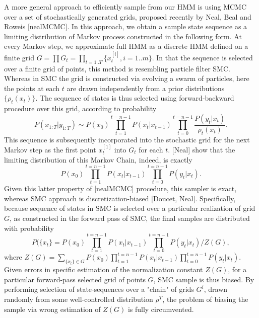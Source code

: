 \documentclass[amsmath,amssymb]{revtex4}
\begin{document}
A more general approach to efficiently sample from our HMM is using MCMC over a set of stochastically generated grids, proposed recently by Neal, Beal and Roweis [nealMCMC]. In this approach, we obtain a sample state sequence as a limiting distribution of Markov process constructed in the following form. At every Markov step, we approximate full HMM as a discrete HMM defined on a finite grid $G=\prod G_t=\prod_{t=1..T}\{x^{[i]}_t, i=1..m\}$. In that the sequence is selected over a finite grid of points, this method is resembling particle filter SMC. Whereas in SMC the grid is constructed via evolving a swarm of particles, here the points at each $t$ are drawn independently from a prior distributions $\{\rho_t(x_t)\}$. The sequence of states is thus selected using forward-backward procedure over this grid, according to probability
\begin{equation}
P(x_{1:T}|y_{1:T})\sim P(x_0)\prod\limits_{t=1}^{t=n-1}P(x_t|x_{t-1})\prod\limits_{t=0}^{t=n-1}
\frac{P(y_t|x_t)}{\rho_t(x_t)}.
\end{equation}
This sequence is subsequently incorporated into the stochastic grid for the next Markov step as the first point $x^{[1]}_t$ into $G_t$ for each $t$. [Neal] show that the limiting distribution of this Markov Chain, indeed, is exactly
\begin{equation}
P(x_0)\prod\limits_{t=1}^{t=n-1}P(x_t|x_{t-1})\prod\limits_{t=0}^{t=n-1}P(y_t|x_t).
\end{equation}
Given this latter property of [nealMCMC] procedure, this sampler is exact, whereas SMC approach is discretization-biased [Doucet, Neal]. Specifically, because sequence of states in SMC is selected over a particular realization of grid $G$, as constructed in the forward pass of SMC, the final samples are distributed with probability
\begin{equation}
P(\{x_t\}=P(x_0)\prod\limits_{t=1}^{t=n-1}P(x_t|x_{t-1})\prod\limits_{t=0}^{t=n-1}P(y_t|x_t)/Z(G),
\end{equation}
where $Z(G)=\sum_{\{x_t\}\in G}P(x_0)\prod\limits_{t=1}^{t=n-1}P(x_t|x_{t-1}) \prod\limits_{t=0}^{t=n-1}P(y_t|x_t)$. Given errors in specific estimation of the normalization constant $Z(G)$, for a particular forward-pass selected grid of points $G$, SMC sample is thus biased. By performing selection of state-sequences over a "chain" of grids $G^i$, drawn randomly from some well-controlled distribution $\rho^T$, the problem of biasing the sample via wrong estimation of $Z(G)$ is fully circumvented.
\end{document}
